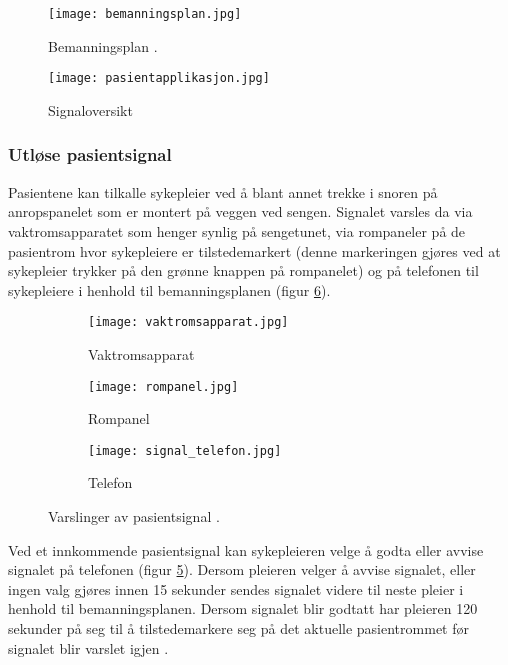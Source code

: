 \begin{figure}[H]
\centering
\texttt{[image: bemanningsplan.jpg]}
\caption{Bemanningsplan \citep{BrukermanualforPasientsignalogPasientsignalapplikasjon}.}
\label{IMATISbemanningsplan}
\end{figure}

\begin{figure}[H]
\centering
\texttt{[image: pasientapplikasjon.jpg]}
\caption{Signaloversikt \citep{BrukermanualforPasientsignalogPasientsignalapplikasjon}}
\label{IMATISpasientapplikasjon}
\end{figure}

\subsubsection{Utløse pasientsignal}
Pasientene kan tilkalle sykepleier ved å blant annet trekke i snoren på anropspanelet som er montert på veggen ved sengen. Signalet varsles da via vaktromsapparatet som henger synlig på sengetunet, via rompaneler på de pasientrom hvor sykepleiere er tilstedemarkert (denne markeringen gjøres ved at sykepleier trykker på den grønne knappen på rompanelet) og på telefonen til sykepleiere i henhold til bemanningsplanen (figur \ref{varslinger}). 

\begin{figure}[H]
        \centering
         \begin{subfigure}[b]{0.3\textwidth}
        		\centering
                \texttt{[image: vaktromsapparat.jpg]}
                \caption{Vaktromsapparat}
                \label{rompanel}
        \end{subfigure}
        \begin{subfigure}[b]{0.3\textwidth}
        		\centering
                \texttt{[image: rompanel.jpg]}
                \caption{Rompanel}
                \label{rompanel}
        \end{subfigure}
          \begin{subfigure}[b]{0.3\textwidth}
        		\centering
                \texttt{[image: signal\_telefon.jpg]}
                \caption{Telefon}
                \label{signal_telefon}
        \end{subfigure}      
        \caption{Varslinger av pasientsignal \citep{BrukerveiledningforPasientsignal}.}
        \label{varslinger}
\end{figure}

\noindent
Ved et innkommende pasientsignal kan sykepleieren velge å godta eller avvise signalet på telefonen (figur \ref{signal_telefon}). Dersom pleieren velger å avvise signalet, eller ingen valg gjøres innen 15 sekunder sendes signalet videre til neste pleier i henhold til bemanningsplanen. Dersom signalet blir godtatt har pleieren 120 sekunder på seg til å tilstedemarkere seg på det aktuelle pasientrommet før signalet blir varslet igjen \citep{BrukermanualforPasientsignalogPasientsignalapplikasjon}.  

